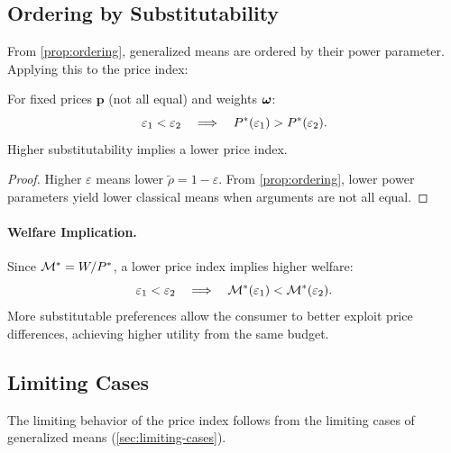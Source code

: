 \subsection{Ordering by Substitutability}
\label{subsec:ordering-substitutability}

From \cref{prop:ordering}, generalized means are ordered by their power parameter. Applying this to the price index:

\begin{proposition}
\label{prop:price-ordering}
For fixed prices $\mathbf{p}$ (not all equal) and weights $\boldsymbol{\omega}$:
\begin{equation}
\varepsilon_1 < \varepsilon_2 \quad \Longrightarrow \quad P^{*}(\varepsilon_1) > P^{*}(\varepsilon_2).
\end{equation}
Higher substitutability implies a lower price index.
\end{proposition}

\begin{proof}
Higher $\varepsilon$ means lower $\tilde{\rho} = 1 - \varepsilon$. From \cref{prop:ordering}, lower power parameters yield lower classical means when arguments are not all equal.
\end{proof}

\paragraph{Welfare Implication.}
Since $\mathcal{M}^* = W/P^{*}$, a lower price index implies higher welfare:
\begin{equation}
\varepsilon_1 < \varepsilon_2 \quad \Longrightarrow \quad \mathcal{M}^*(\varepsilon_1) < \mathcal{M}^*(\varepsilon_2).
\end{equation}
More substitutable preferences allow the consumer to better exploit price differences, achieving higher utility from the same budget.

\subsection{Limiting Cases}
\label{subsec:limiting-cases}

The limiting behavior of the price index follows from the limiting cases of generalized means (\cref{sec:limiting-cases}).

